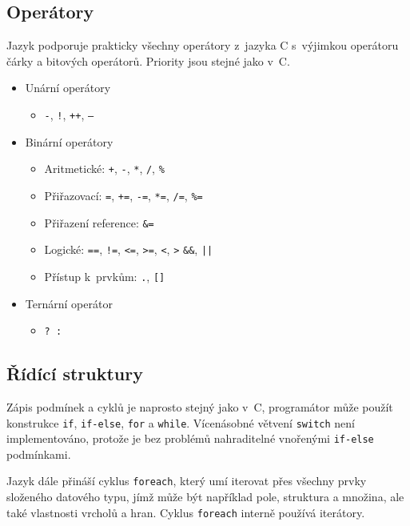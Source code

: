 \documentclass[11pt,twoside,a4paper]{book}
\begin{document}
\subsection{Operátory}

Jazyk podporuje prakticky všechny operátory z~jazyka C s~výjimkou operátoru čárky a bitových operátorů. Priority jsou stejné jako v~C.

\begin{itemize}
\item Unární operátory
	\begin{itemize}
	\item \texttt{-}, \texttt{!}, \texttt{++}, \texttt{--}
	\end{itemize}
\item Binární operátory
	\begin{itemize}
	\item Aritmetické: \texttt{+}, \texttt{-}, \texttt{*}, \texttt{/}, \texttt{\%}
	\item Přiřazovací: \texttt{=}, \texttt{+=}, \texttt{-=}, \texttt{*=}, \texttt{/=}, \texttt{\%=}
	\item Přiřazení reference: \texttt{\&=}
	\item Logické: \texttt{==}, \texttt{!=}, \texttt{<=}, \texttt{>=}, \texttt{<}, \texttt{>} \texttt{\&\&}, \texttt{||}
	\item Přístup k~prvkům: \texttt{.}, \texttt{[]}
	\end{itemize}
\item Ternární operátor
	\begin{itemize}
	\item \texttt{? :}
	\end{itemize}
\end{itemize}


\subsection{Řídící struktury}

Zápis podmínek a cyklů je naprosto stejný jako v~C, programátor může použít konstrukce \texttt{if}, \texttt{if-else}, \texttt{for} a \texttt{while}. Vícenásobné větvení \texttt{switch} není implementováno, protože je bez problémů nahraditelné vnořenými \texttt{if-else} podmínkami.

Jazyk dále přináší cyklus \texttt{foreach}, který umí iterovat přes všechny prvky složeného datového typu, jímž může být například pole, struktura a množina, ale také vlastnosti vrcholů a hran. Cyklus \texttt{foreach} interně používá iterátory.
\end{document}
